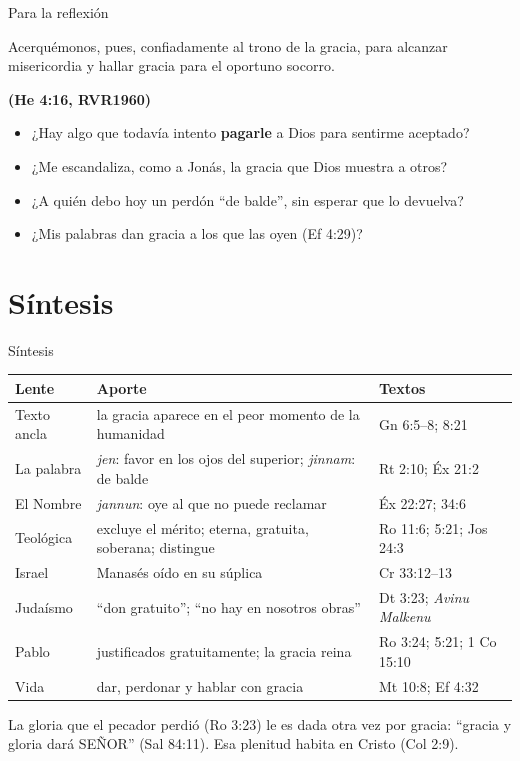 \documentclass[hyperref={bookmarks=false},aspectratio=169]{beamer}
\newcommand{\SENOR}{S{\fontsize{0.78em}{1em}\selectfont EÑOR}}
\newcommand{\fuente}[1]{\par\hfill{\upshape\bfseries\footnotesize\textcolor{azul}{#1}}}
\newcommand{\destacar}[1]{\textbf{\textcolor{azul}{#1}}}
\begin{document}
\begin{frame}{Para la reflexión}
\begin{cita}Acerquémonos, pues, confiadamente al trono de la gracia, para alcanzar misericordia y hallar gracia para el oportuno socorro.\fuente{(He 4:16, RVR1960)}\end{cita}
\small
\begin{itemize}
\item ¿Hay algo que todavía intento \destacar{pagarle} a Dios para sentirme aceptado?
\item ¿Me escandaliza, como a Jonás, la gracia que Dios muestra a otros?
\item ¿A quién debo hoy un perdón ``de balde'', sin esperar que lo devuelva?
\item ¿Mis palabras dan gracia a los que las oyen (Ef 4:29)?
\end{itemize}
\end{frame}

\section{Síntesis}

\begin{frame}{Síntesis}
\scriptsize\renewcommand{\arraystretch}{1.1}
\begin{tabular}{@{}>{\RaggedRight\arraybackslash}p{1.8cm}>{\RaggedRight\arraybackslash}p{6.6cm}>{\RaggedRight\arraybackslash}p{3.2cm}@{}}
\toprule
\textbf{Lente} & \textbf{Aporte} & \textbf{Textos} \\ \midrule
Texto ancla & la gracia aparece en el peor momento de la humanidad & Gn 6:5--8; 8:21 \\
La palabra & \emph{jen}: favor en los ojos del superior; \emph{jinnam}: de balde & Rt 2:10; Éx 21:2 \\
El Nombre & \emph{jannun}: oye al que no puede reclamar & Éx 22:27; 34:6 \\
Teológica & excluye el mérito; eterna, gratuita, soberana; distingue & Ro 11:6; 5:21; Jos 24:3 \\
Israel & Manasés oído en su súplica & 2 Cr 33:12--13 \\
Judaísmo & ``don gratuito''; ``no hay en nosotros obras'' & Dt 3:23; \emph{Avinu Malkenu} \\
Pablo & justificados gratuitamente; la gracia reina & Ro 3:24; 5:21; 1 Co 15:10 \\
Vida & dar, perdonar y hablar con gracia & Mt 10:8; Ef 4:32 \\
\bottomrule
\end{tabular}\par\medskip
\begin{tcolorbox}[colback=papiro,colframe=dorado,boxrule=1pt,arc=3pt,fontupper=\small\itshape]
La gloria que el pecador perdió (Ro 3:23) le es dada otra vez por gracia: ``gracia y gloria dará \SENOR'' (Sal 84:11). Esa plenitud habita en Cristo (Col 2:9).
\end{tcolorbox}
\end{frame}
\end{document}
